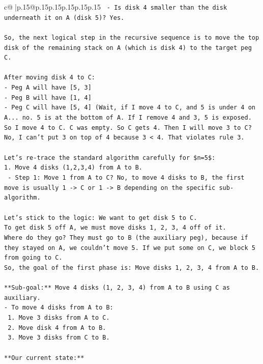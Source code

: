\documentclass{article}
\begin{document}
{\begin{supertabular}{c@{$\;$}|p{.15\linewidth}@{}p{.15\linewidth}p{.15\linewidth}p{.15\linewidth}p{.15\linewidth}p{.15\linewidth}}
{{{\texttt{   {-} Is disk 4 smaller than the disk underneath it on A (disk 5)? Yes.} \\
\\ 
\texttt{So, the next logical step in the recursive sequence is to move the top disk of the remaining stack on A (which is disk 4) to the target peg C.} \\
\\ 
\texttt{After moving disk 4 to C:} \\
\texttt{{-} Peg A will have {[}5, 3{]}} \\
\texttt{{-} Peg B will have {[}1, 4{]}} \\
\texttt{{-} Peg C will have {[}5, 4{]} (Wait, if I move 4 to C, and 5 is under 4 on A... no. 5 is at the bottom of A. If I remove 4 and 3, 5 is exposed. So I move 4 to C. C was empty. So C gets 4. Then I will move 3 to C? No, I can't put 3 on top of 4 because 3 < 4. That violates rule 3.} \\
\\ 
\texttt{Let's re{-}trace the standard algorithm carefully for \$n=5\$:} \\
\texttt{1. Move 4 disks (1,2,3,4) from A to B.} \\
\texttt{   {-} Step 1: Move 1 from A to C? No, to move 4 disks to B, the first move is usually 1 {-}> C or 1 {-}> B depending on the specific sub{-}algorithm.} \\
\\ 
\texttt{Let's stick to the logic: We want to get disk 5 to C.} \\
\texttt{To get disk 5 off A, we must move disks 1, 2, 3, 4 off of it.} \\
\texttt{Where do they go? They must go to B (the auxiliary peg), because if they stayed on A, we couldn't move 5. If we put some on C, we block 5 from going to C.} \\
\texttt{So, the goal of the first phase is: Move disks 1, 2, 3, 4 from A to B.} \\
\\ 
\texttt{**Sub{-}goal:** Move 4 disks (1, 2, 3, 4) from A to B using C as auxiliary.} \\
\texttt{{-} To move 4 disks from A to B:} \\
\texttt{  1. Move 3 disks from A to C.} \\
\texttt{  2. Move disk 4 from A to B.} \\
\texttt{  3. Move 3 disks from C to B.} \\
\\ 
\texttt{**Our current state:**} \\
}}}
\end{supertabular}}
\end{document}
